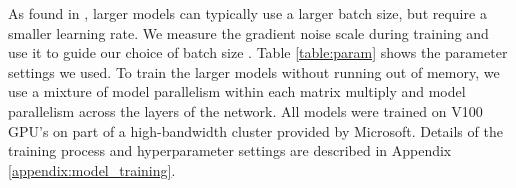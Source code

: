 As found in \cite{kaplan2020scaling, mcc2018batchsize}, larger models can typically use a larger batch size, but require a smaller learning rate. We measure the gradient noise scale during training and use it to guide our choice of batch size \cite{mcc2018batchsize}. Table \ref{table:param} shows the parameter settings we used. To train the larger models without running out of memory, we use a mixture of model parallelism within each matrix multiply and model parallelism across the layers of the network.   All models were trained on V100 GPU’s on part of a high-bandwidth cluster provided by Microsoft.  Details of the training process and hyperparameter settings are described in Appendix \ref{appendix:model_training}.

